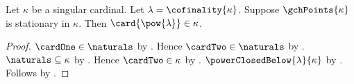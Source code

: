 \begin{theorem}\label{stationary_gch_points_bound_cofinality_powerset}
    Let $\kappa$ be a singular cardinal.
    Let $\lambda=\cofinality{\kappa}$.
    Suppose $\gchPoints{\kappa}$ is stationary in $\kappa$.
    Then $\card{\pow{\lambda}}\in\kappa$.
\end{theorem}
\begin{proof}
    $\cardOne\in\naturals$
        by .
    Hence $\cardTwo\in\naturals$
        by .
    $\naturals\subseteq\kappa$
        by .
    Hence $\cardTwo\in\kappa$ by .
    $\powerClosedBelow{\lambda}{\kappa}$
        by .
    Follows by .
\end{proof}
